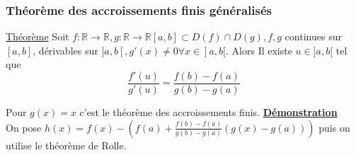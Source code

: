 \documentclass[12pt,a4paper]{article}
\newcommand{\evid}[1]{\textbf{\underline{#1}}}
\newcommand{\R}{\ensuremath{\mathbb{R}} }
\newcommand{\rtor}{\ensuremath{\R \to \R} }
\newcommand{\Theoreme}{\underline{Théorème} }
\begin{document}
{\subsubsection{Théorème des accroissements finis généralisés}
\begin{boite}
	\Theoreme Soit $f:\rtor, g:\rtor [a,b] \subset D(f) \cap D(g), f,g$ continues sur $[a,b]$, dérivables sur $]a,b[, g'(x) \neq 0 \forall x \in ]a,b[$. Alors Il existe $u \in ]a,b[$ tel que 
	\begin{equation}
		\frac{f'(u)}{g'(u)} = \frac{f(b)-f(a)}{g(b)-g(a)}
	\end{equation}
\end{boite}
Pour $g(x) = x$ c'est le théorème des accroissements finis.
\evid{Démonstration}\\
On pose $h(x) = f(x) - \left(f(a)+\frac{f(b)-f(a)}{g(b)-g(a)}(g(x)-g(a))\right)$ puis on utilise le théorème de Rolle.

}
\end{document}
